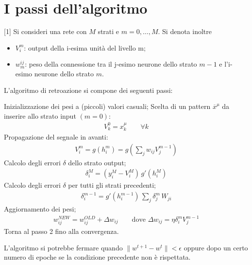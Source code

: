 
	\newpage

	\section{I passi dell'algoritmo} %
	\label{sec:l'algoritmo}

	\algrenewcommand{\alglinenumber}[1]{\scriptsize{}}%
	Si consideri una rete con $M$ strati e $m=0,\dots,M$. Si denota inoltre
	\begin{itemize}
		\item $V^m_i$: output della i-esima unità del livello m;
		\item $w^{ij}_m$: peso della connessione tra il j-esimo neurone dello strato $m-1$ e l'i-esimo neurone dello strato $m$. 
	\end{itemize}
	L'algoritmo di retroazione si compone dei seguenti passi:
	\begin{algorithmic}[1]%
		\State Inizializzazione dei pesi a (piccoli) valori casuali;
		\State Scelta di un pattern $\overline{x}^\mu$ da inserire allo strato input $(m=0)$:
		\begin{align*}
			V^0_k = x^\mu_k \qquad \forall k
		\end{align*}
		\State Propagazione del segnale in avanti:
		\begin{align*}
			V^m_i = g(h_i^m) = g\left(\sum_j w_{ij} V_j^{m-1}\right)
		\end{align*}
		\State Calcolo degli errori $\delta$ dello strato output;
		\begin{align*}
			\delta^M_i = (y^M_i - V^M_i) \, g'(h^M_i)
		\end{align*}
		\State Calcolo degli errori $\delta$ per tutti gli strati precedenti;
		\begin{align*}
			\delta^{m-1}_i = g'\left(h^{m-1}_i\right) \, \sum_j \delta^m_j \, W_{ji}
		\end{align*}
		\State Aggiornamento dei pesi;
		\begin{align*}
			w^{NEW}_{ij} = w^{OLD}_{ij} + \Delta w_{ij} \qquad \text{dove } \Delta w_{ij} = \eta \delta_i^m V_j^{m-1} 
		\end{align*}
		\State Torna al passo 2 fino alla convergenza.
	\end{algorithmic}
	L'algoritmo si potrebbe fermare quando $\| w^{t+1} - w^t \| < \epsilon$ oppure dopo un certo numero di epoche se la condizione precedente non è rispettata.

